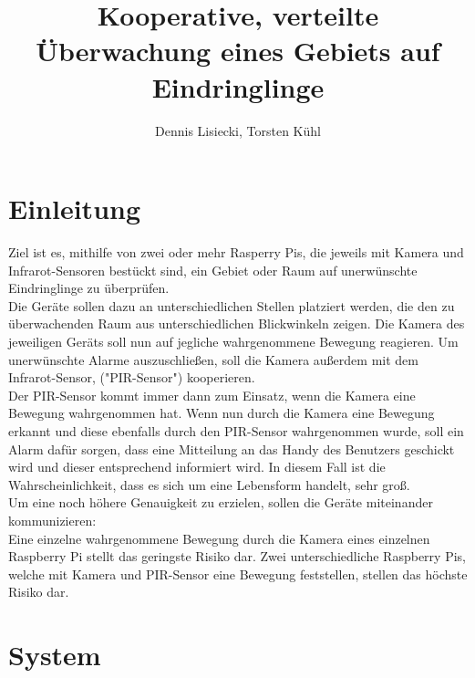 \documentclass[journal]{IEEEtran}
\title{Kooperative, verteilte Überwachung eines Gebiets auf Eindringlinge}		%
\author{Dennis Lisiecki, Torsten Kühl}								%
\begin{document}

\maketitle	%




\section{Einleitung} 
Ziel ist es, mithilfe von zwei oder mehr Rasperry Pis, die jeweils mit Kamera und Infrarot-Sensoren bestückt sind, ein Gebiet oder Raum auf unerwünschte Eindringlinge zu überprüfen.\\ Die Geräte sollen dazu an unterschiedlichen Stellen platziert werden, die den zu überwachenden Raum aus unterschiedlichen Blickwinkeln zeigen. Die Kamera des jeweiligen Geräts soll nun auf jegliche wahrgenommene Bewegung reagieren. Um unerwünschte Alarme auszuschließen, soll die Kamera außerdem mit dem Infrarot-Sensor, ("PIR-Sensor") kooperieren. \\  Der PIR-Sensor kommt immer dann zum Einsatz, wenn die Kamera eine Bewegung wahrgenommen hat. Wenn nun durch die Kamera eine Bewegung erkannt und diese ebenfalls durch den PIR-Sensor wahrgenommen wurde, soll ein Alarm dafür sorgen, dass eine Mitteilung an das Handy des Benutzers geschickt wird und dieser entsprechend informiert wird. In diesem Fall ist die Wahrscheinlichkeit, dass es sich um eine Lebensform handelt, sehr groß.\\ Um eine noch höhere Genauigkeit zu erzielen, sollen die Geräte miteinander kommunizieren:\\ Eine einzelne wahrgenommene Bewegung durch die Kamera eines einzelnen Raspberry Pi stellt das geringste Risiko dar. Zwei unterschiedliche Raspberry Pis, welche mit Kamera und PIR-Sensor eine Bewegung feststellen, stellen das höchste Risiko dar.




\section{System}
\end{document}
